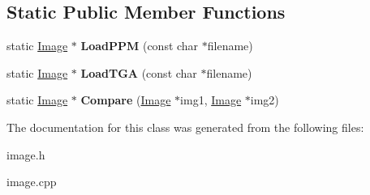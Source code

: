 \subsection*{\-Static \-Public \-Member \-Functions}
\begin{DoxyCompactItemize}
\item 
\hypertarget{classImage_ac2fc9197cc697efa2c610efe0519b466}{static \hyperlink{classImage}{\-Image} $\ast$ {\bfseries \-Load\-P\-P\-M} (const char $\ast$filename)}\label{classImage_ac2fc9197cc697efa2c610efe0519b466}

\item 
\hypertarget{classImage_a7c6b50633e25f53f9c5f1af90bf8332b}{static \hyperlink{classImage}{\-Image} $\ast$ {\bfseries \-Load\-T\-G\-A} (const char $\ast$filename)}\label{classImage_a7c6b50633e25f53f9c5f1af90bf8332b}

\item 
\hypertarget{classImage_ac025574f36e212489546450083f3d331}{static \hyperlink{classImage}{\-Image} $\ast$ {\bfseries \-Compare} (\hyperlink{classImage}{\-Image} $\ast$img1, \hyperlink{classImage}{\-Image} $\ast$img2)}\label{classImage_ac025574f36e212489546450083f3d331}

\end{DoxyCompactItemize}


\-The documentation for this class was generated from the following files\-:\begin{DoxyCompactItemize}
\item 
image.\-h\item 
image.\-cpp\end{DoxyCompactItemize}
